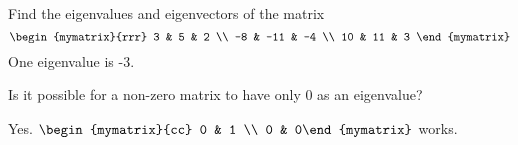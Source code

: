 \begin{enumialphparenastyle}
\begin{ex} Find the eigenvalues and eigenvectors of the matrix  
\begin{equation*}
\begin{mymatrix}{rrr}
3 & 5 & 2 \\
-8 & -11 & -4 \\
10 & 11 & 3
\end{mymatrix}
\end{equation*}
One eigenvalue is -3. 
\end{ex}

\begin{ex} Is it possible for a non-zero matrix to have only $0$ as an eigenvalue?
\vspace{1mm} 
\begin{sol}
Yes. $\begin{mymatrix}{cc}
0 & 1 \\
0 & 0%
\end{mymatrix} $ works.
\end{sol}
\end{ex}

\end{enumialphparenastyle}
